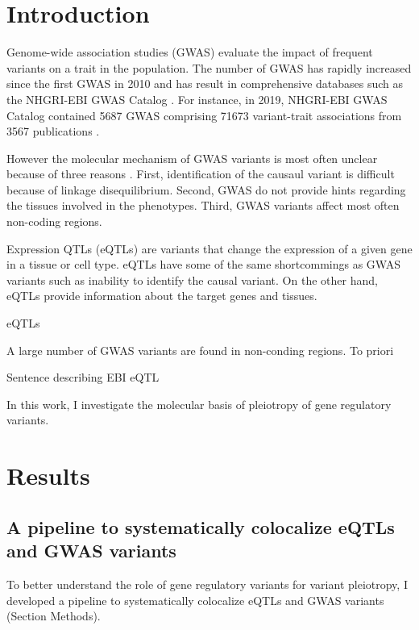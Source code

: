 \section*{Introduction}\label{sec:introduction}

Genome-wide association studies (GWAS) evaluate the impact of frequent variants on a trait in the population.
%
The number of GWAS has rapidly increased since the first GWAS in 2010 and has result in comprehensive databases such as the NHGRI-EBI GWAS Catalog \citep{2018.Parkinson.Buniello}.
%
For instance, in 2019, NHGRI-EBI GWAS Catalog contained 5687 GWAS comprising 71673 variant-trait associations from 3567 publications \citep{2018.Parkinson.Buniello}.

However the molecular mechanism of GWAS variants is most often unclear because of three reasons \citep{2020.Trynka.CanoGamez}.
%
First, identification of the causaul variant is difficult because of linkage disequilibrium.
%
Second, GWAS do not provide hints regarding the tissues involved in the phenotypes.
%
Third, GWAS variants affect most often non-coding regions.

Expression QTLs (eQTLs) are variants that change the expression of a given gene in a tissue or cell type.
%
eQTLs have some of the same shortcommings as GWAS variants such as inability to identify the causal variant.
%
On the other hand, eQTLs provide information about the target genes and tissues.

eQTLs 


A large number of GWAS variants are found in non-conding regions.
To priori

Sentence describing EBI eQTL

In this work, I investigate the molecular basis of pleiotropy of gene regulatory variants.

\section*{Results}\label{s:results}

\subsection*{A pipeline to systematically colocalize eQTLs and GWAS variants}

To better understand the role of gene regulatory variants for variant pleiotropy, I developed a pipeline to systematically colocalize eQTLs and GWAS variants (Section Methods).

